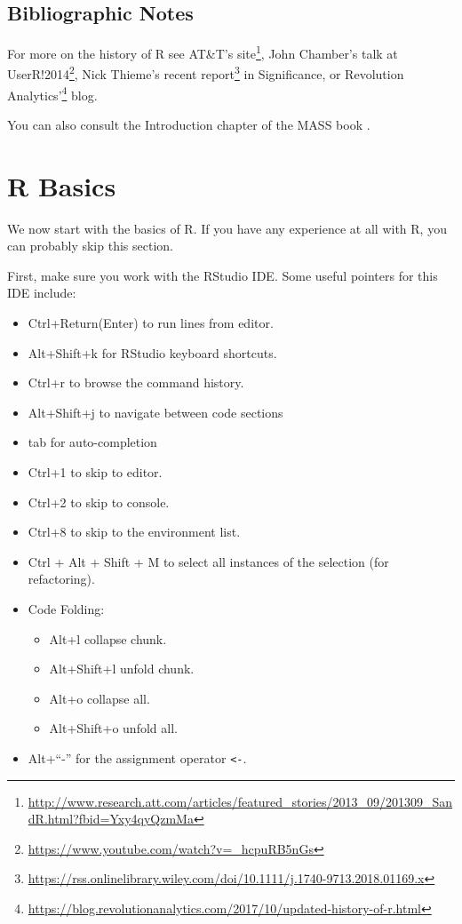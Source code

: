 \documentclass[]{book}
\providecommand{\tightlist}{%
  \setlength{\itemsep}{0pt}\setlength{\parskip}{0pt}}
\renewcommand{\href}[2]{#2\footnote{\url{#1}}}
\theoremstyle{definition}
\theoremstyle{definition}
\theoremstyle{definition}
\theoremstyle{remark}
\begin{document}
\hypertarget{bibliographic-notes}{%
\section{Bibliographic Notes}\label{bibliographic-notes}}

For more on the history of R see
\href{http://www.research.att.com/articles/featured_stories/2013_09/201309_SandR.html?fbid=Yxy4qyQzmMa}{AT\&T's site},
John Chamber's talk at \href{https://www.youtube.com/watch?v=_hcpuRB5nGs}{UserR!2014},
Nick Thieme's \href{https://rss.onlinelibrary.wiley.com/doi/10.1111/j.1740-9713.2018.01169.x}{recent report} in Significance, or
\href{https://blog.revolutionanalytics.com/2017/10/updated-history-of-r.html}{Revolution Analytics'} blog.

You can also consult the Introduction chapter of the MASS book \citep{venables2013modern}.

\hypertarget{basics}{%
\chapter{R Basics}\label{basics}}

We now start with the basics of R.
If you have any experience at all with R, you can probably skip this section.

First, make sure you work with the RStudio IDE.
Some useful pointers for this IDE include:

\begin{itemize}
\tightlist
\item
  Ctrl+Return(Enter) to run lines from editor.
\item
  Alt+Shift+k for RStudio keyboard shortcuts.
\item
  Ctrl+r to browse the command history.
\item
  Alt+Shift+j to navigate between code sections
\item
  tab for auto-completion
\item
  Ctrl+1 to skip to editor.
\item
  Ctrl+2 to skip to console.
\item
  Ctrl+8 to skip to the environment list.
\item
  Ctrl + Alt + Shift + M to select all instances of the selection (for refactoring).
\item
  Code Folding:

  \begin{itemize}
  \tightlist
  \item
    Alt+l collapse chunk.
  \item
    Alt+Shift+l unfold chunk.
  \item
    Alt+o collapse all.
  \item
    Alt+Shift+o unfold all.
  \end{itemize}
\item
  Alt+``-'' for the assignment operator \texttt{\textless{}-}.
\end{itemize}
\end{document}
